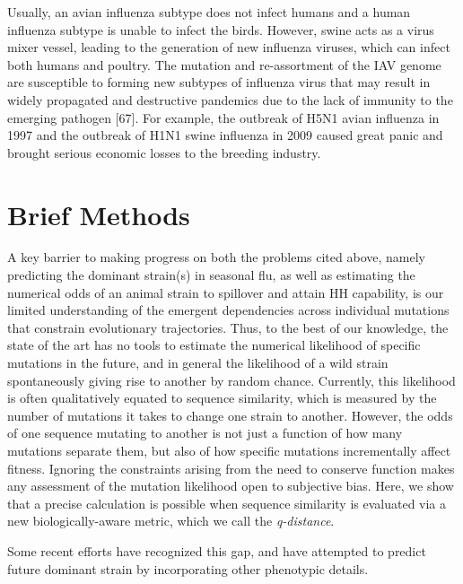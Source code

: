 \documentclass[onecolumn, compsoc,10pt]{IEEEtran}
\begin{document}
{Usually, an avian influenza subtype does not infect humans and a human influenza subtype is unable to infect the birds. However, swine acts as a virus mixer vessel, leading to the generation of new influenza viruses, which can infect both humans and poultry. The mutation and re-assortment of the IAV genome are susceptible to forming new subtypes of influenza virus that may result in widely propagated and destructive pandemics due to the lack of immunity to the emerging pathogen [67]. For example, the outbreak of H5N1 avian influenza in 1997 and the outbreak of H1N1 swine influenza in 2009 caused great panic and brought serious economic losses to the breeding industry.



}


    \section*{Brief Methods}
A key barrier to making progress  on both the problems cited above, namely predicting the dominant strain(s) in seasonal flu, as well as estimating the numerical odds of an animal strain  to spillover and attain HH capability,  is our limited understanding of the emergent dependencies across individual mutations that  constrain evolutionary trajectories. Thus, to the best of our knowledge, the state of the art has no tools to estimate the numerical likelihood of specific mutations in the future, and in general  the likelihood of a wild strain spontaneously giving rise to another by random chance. Currently, this likelihood is often qualitatively equated to sequence similarity, which is measured by the number of mutations it takes to change one strain to another. However, the odds of one sequence mutating to another is not just a function of how many mutations separate them, but also of how specific mutations incrementally affect fitness. Ignoring the constraints arising from the need to conserve function makes any assessment of the mutation likelihood open to subjective bias. Here, we show that a precise calculation is possible when sequence similarity is evaluated via a new biologically-aware metric, which we call the \textit{q-distance}.

Some recent efforts have recognized this gap, and have attempted to predict future dominant strain by incorporating other phenotypic details. 
\end{document}
